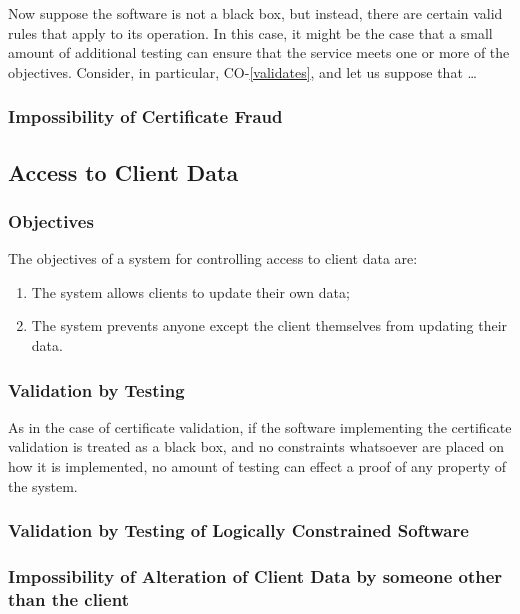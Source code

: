 \documentclass[journal]{IEEEtran}
\begin{document}
Now suppose the software is not a black box, but instead, there
are certain valid rules that apply to its operation. In this case,
it might be the case that a small amount of additional testing
can ensure that the service meets one or more of the objectives.
Consider, in particular, CO-\ref{validates}, and let us suppose
that \dots

\subsubsection{Impossibility of Certificate Fraud}

\subsection{Access to Client Data}

\subsubsection{Objectives}

The objectives of a system for controlling access to client data are:
\begin{enumerate}[DO-1]
  \item The system allows clients to update their own data;
  \item The system prevents anyone except the client themselves from updating their data.
\end{enumerate}

\subsubsection{Validation by Testing}

As in the case of certificate validation,
if the software implementing the certificate validation is treated
as a black box, and no constraints whatsoever are placed on how it is
implemented, no amount of testing can effect a proof of any
property of the system.

\subsubsection{Validation by Testing of Logically Constrained Software}

\subsubsection{Impossibility of Alteration of Client Data by someone other than the client}
\end{document}

